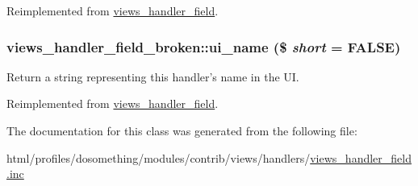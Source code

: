 Reimplemented from \hyperlink{classviews__handler__field_a0435d161922b7b4b84f02a2e79bb947a}{views\_\-handler\_\-field}.\hypertarget{classviews__handler__field__broken_a0b3272926656e5fc3f6c011fa51746ed}{
\subsubsection[{ui\_\-name}]{\setlength{\rightskip}{0pt plus 5cm}views\_\-handler\_\-field\_\-broken::ui\_\-name (\$ {\em short} = {\ttfamily FALSE})}}
\label{classviews__handler__field__broken_a0b3272926656e5fc3f6c011fa51746ed}
Return a string representing this handler's name in the UI. 

Reimplemented from \hyperlink{classviews__handler__field_a593c70c519615b5be3b5cd43cd1b663b}{views\_\-handler\_\-field}.

The documentation for this class was generated from the following file:\begin{DoxyCompactItemize}
\item 
html/profiles/dosomething/modules/contrib/views/handlers/\hyperlink{views__handler__field_8inc}{views\_\-handler\_\-field.inc}\end{DoxyCompactItemize}
